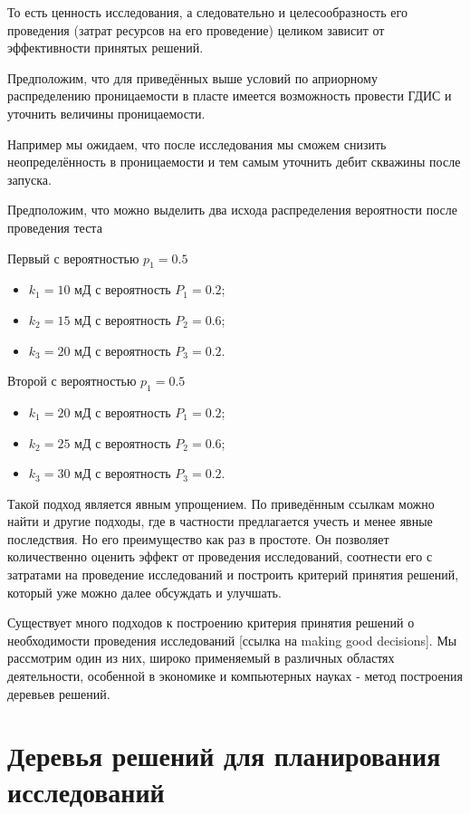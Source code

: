 То есть ценность исследования, а следовательно и целесообразность его проведения (затрат ресурсов на его проведение) целиком зависит от эффективности принятых решений. 

Предположим, что для приведённых выше условий по априорному распределению проницаемости в пласте имеется возможность провести ГДИС и уточнить величины проницаемости. 

Например мы ожидаем, что после исследования мы сможем снизить неопределённость в проницаемости и тем самым уточнить дебит скважины после запуска.  

Предположим, что можно выделить два исхода распределения вероятности после проведения теста

Первый с вероятностью $p_1 = 0.5$

\begin{itemize}
	\item $k_1 = 10$ мД с вероятность $P_1 = 0.2$; 
	\item $k_2 = 15$ мД с вероятность $P_2 = 0.6$; 
	\item $k_3 = 20$ мД с вероятность $P_3 = 0.2$. 
\end{itemize}

Второй с вероятностью $p_1 = 0.5$

\begin{itemize}
	\item $k_1 = 20$ мД с вероятность $P_1 = 0.2$; 
	\item $k_2 = 25$ мД с вероятность $P_2 = 0.6$; 
	\item $k_3 = 30$ мД с вероятность $P_3 = 0.2$. 
\end{itemize}


Такой подход является явным упрощением. По приведённым ссылкам можно найти и другие подходы, где в частности предлагается учесть и менее явные последствия. Но его преимущество как раз в простоте. Он позволяет количественно оценить эффект от проведения исследований, соотнести его с затратами на проведение исследований и построить критерий принятия решений, который уже можно далее обсуждать и улучшать. 


Существует много подходов к построению критерия принятия решений о необходимости проведения исследований [ссылка на making good decisions]. Мы рассмотрим один из них, широко применяемый в различных областях деятельности, особенной в экономике и компьютерных науках - метод построения деревьев решений. \cite{AL_appl_patt_2007}

\section{Деревья решений для планирования исследований}

